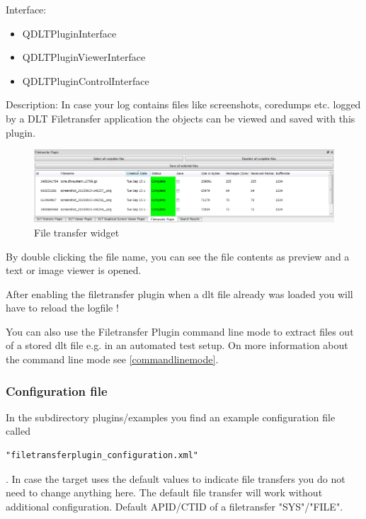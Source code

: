 \documentclass[a4paper,11pt]{article}
\begin{document}
Interface:
\begin{itemize}
    \item QDLTPluginInterface
    \item QDLTPluginViewerInterface
    \item QDLTPluginControlInterface
\end{itemize}
Description:
    In case your log contains files like screenshots, coredumps etc. logged by a DLT Filetransfer application
    the objects can be viewed and saved with this plugin. \linebreak

\par

\begin{figure}[H]
 \centering
 \includegraphics[width=1.0\textwidth]{images/filetransfer_list.png}
 \caption{File transfer widget}
 \label{fig:filetransferwidget}
\end{figure}


By double clicking the file name, you can see the file contents as preview and a text or image viewer is opened.

After enabling the filetransfer plugin when a dlt file already was loaded you will have to reload the logfile !

You can also use the Filetransfer Plugin command line mode to extract files out of a stored dlt file e.g. in an automated test setup.
On more information about the command line mode see \autoref{commandlinemode}.

\subsubsection{Configuration file}
In the subdirectory plugins/examples you find an example configuration file called \begin{verbatim}"filetransferplugin_configuration.xml"\end{verbatim}.
In case the target uses the default values to indicate file transfers you do not need to change anything here.
The default file transfer will work without additional configuration. Default APID/CTID of a filetransfer "SYS"/"FILE".
\end{document}
